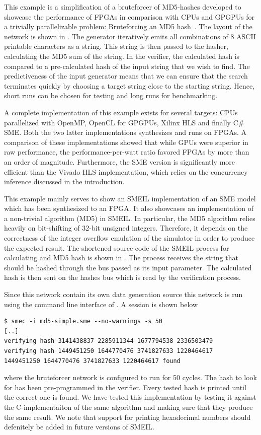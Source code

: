 This example is a simplification of a bruteforcer of MD5-hashes developed to
showcase the performance of FPGAs in comparison with CPUs and GPGPUs for a
trivially parallelizable problem: Bruteforcing an MD5
hash~\cite{johnsen2018md5}. The layout of the network is shown in
. The generator iteratively emits all combinations of 8 ASCII
printable characters as a string. This string is then passed to the hasher,
calculating the MD5 sum of the string. In the verifier, the calculated hash is
compared to a pre-calculated hash of the input string that we wish to find. The
predictiveness of the input generator means that we can ensure that the search
terminates quickly by choosing a target string close to the starting
string. Hence, short runs can be chosen for testing and long runs for
benchmarking.

A complete implementation of this example exists for several targets: CPUs
parallelized with OpenMP, OpenCL for GPGPUs, Xilinx HLS and finally C\# SME.
Both the two latter implementations synthesizes and runs on FPGAs. A comparison
of these implementations showed that while GPUs were superior in raw
performance, the performance-per-watt ratio favored FPGAs by more than an order
of magnitude. Furthermore, the SME version is significantly more efficient than
the Vivado HLS implementation, which relies on the concurrency inference
discussed in the introduction.

This example mainly serves to show an SMEIL implementation of an SME model which
has been synthesized to an FPGA. It also showcases an implementation of a
non-trivial algorithm (MD5) in SMEIL. In particular, the MD5 algorithm relies
heavily on bit-shifting of 32-bit unsigned integers. Therefore, it depends on
the correctness of the integer overflow emulation of the \libsme{} simulator in
order to produce the expected result. The shortened source code of the SMEIL
process for calculating and MD5 hash is shown in . The
process receives the string that should be hashed through the bus passed as its
{\ttfamily input} parameter. The calculated hash is then sent on the {\ttfamily
  hashes} bus which is read by the verification process.

Since this network contain its own data generation source this network is run
using the command line interface of \libsme. A session is shown below
\begin{verbatim}
$ smec -i md5-simple.sme --no-warnings -s 50 
[..]
verifying hash 3141438837 2285911344 1677794538 2336503479
verifying hash 1449451250 1644770476 3741827633 1220464617
1449451250 1644770476 3741827633 1220464617 found
\end{verbatim}
where the bruteforcer network is configured to run for 50 cycles. The hash to
look for has been pre-programmed in the verifier. Every tested hash is printed
until the correct one is found. We have tested this implementation by testing it
against the C-implementaiton of the same algorithm and making sure that they
produce the same result. We note that support for printing hexadecimal numbers
should defenitely be added in future versions of SMEIL.


